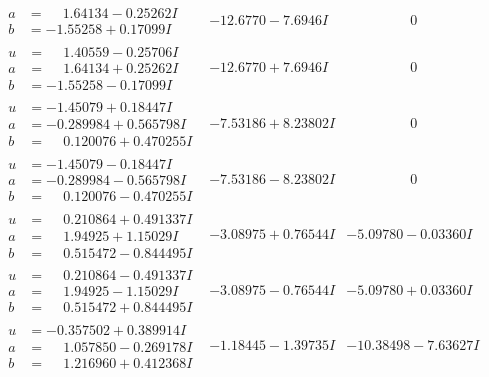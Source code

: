 \documentclass[1p]{elsarticle_modified}
\theoremstyle{definition}
\begin{document}
$$\begin{array}{c|c|c}
\begin{aligned}
a &= \phantom{-}1.64134 - 0.25262 I \\
b &= -1.55258 + 0.17099 I\end{aligned}
 & -12.6770 - 7.6946 I & \phantom{-0.000000 } 0 \\ \hline\begin{aligned}
u &= \phantom{-}1.40559 - 0.25706 I \\
a &= \phantom{-}1.64134 + 0.25262 I \\
b &= -1.55258 - 0.17099 I\end{aligned}
 & -12.6770 + 7.6946 I & \phantom{-0.000000 } 0 \\ \hline\begin{aligned}
u &= -1.45079 + 0.18447 I \\
a &= -0.289984 + 0.565798 I \\
b &= \phantom{-}0.120076 + 0.470255 I\end{aligned}
 & -7.53186 + 8.23802 I & \phantom{-0.000000 } 0 \\ \hline\begin{aligned}
u &= -1.45079 - 0.18447 I \\
a &= -0.289984 - 0.565798 I \\
b &= \phantom{-}0.120076 - 0.470255 I\end{aligned}
 & -7.53186 - 8.23802 I & \phantom{-0.000000 } 0 \\ \hline\begin{aligned}
u &= \phantom{-}0.210864 + 0.491337 I \\
a &= \phantom{-}1.94925 + 1.15029 I \\
b &= \phantom{-}0.515472 - 0.844495 I\end{aligned}
 & -3.08975 + 0.76544 I & -5.09780 - 0.03360 I \\ \hline\begin{aligned}
u &= \phantom{-}0.210864 - 0.491337 I \\
a &= \phantom{-}1.94925 - 1.15029 I \\
b &= \phantom{-}0.515472 + 0.844495 I\end{aligned}
 & -3.08975 - 0.76544 I & -5.09780 + 0.03360 I \\ \hline\begin{aligned}
u &= -0.357502 + 0.389914 I \\
a &= \phantom{-}1.057850 - 0.269178 I \\
b &= \phantom{-}1.216960 + 0.412368 I\end{aligned}
 & -1.18445 - 1.39735 I & -10.38498 - 7.63627 I \\ \hline\begin{aligned}

\end{aligned}
\end{array}$$
\end{document}

